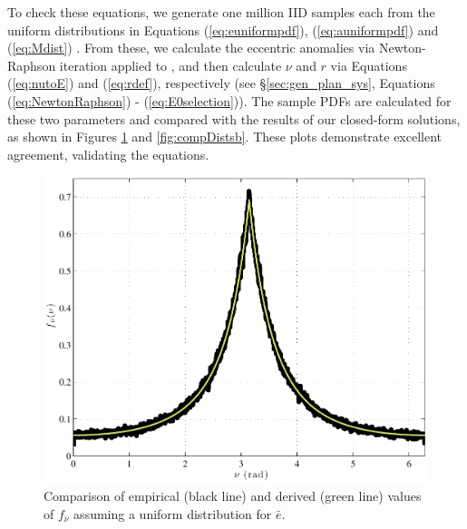 To check these equations, we generate one million IID samples each from the uniform distributions in Equations (\ref{eq:euniformpdf}), (\ref{eq:auniformpdf}) and (\ref{eq:Mdist}) \citep{press1992numerical}.  From these, we calculate the eccentric anomalies via Newton-Raphson iteration applied to , and then calculate $\nu$ and $r$ via Equations (\ref{eq:nutoE}) and (\ref{eq:rdef}), respectively (see \S\ref{sec:gen_plan_sys}, Equations (\ref{eq:NewtonRaphson}) - (\ref{eq:E0selection})).  The sample PDFs are calculated  for these two parameters and compared with the results of our closed-form solutions, as shown in Figures \ref{fig:compDistsa} and \ref{fig:compDistsb}.  These plots demonstrate excellent agreement, validating the equations. 

\begin{figure}[ht]
\centering
\includegraphics[width=5in]{./figures/compDistsa}
 \caption[Validation of analytical $\nu$ PDF]{ Comparison of empirical (black line) and derived (green line) values of $f_{\bar{\nu}}$ assuming a uniform distribution for $\bar e$. \label{fig:compDistsa}}
\end{figure}  

